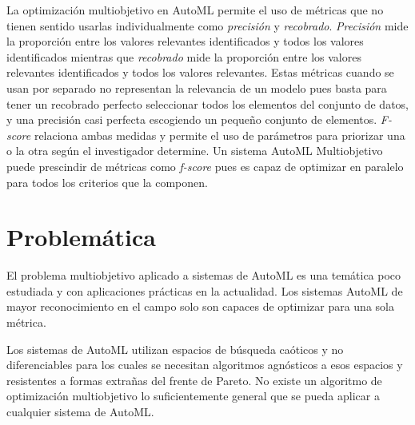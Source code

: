 La optimizaci\'on multiobjetivo en AutoML permite el uso de m\'etricas que no tienen sentido usarlas individualmente como \textit{precisi\'on} y \textit{recobrado}. 
 \textit{Precisi\'on} mide la proporci\'on entre los valores relevantes identificados y todos los valores identificados
 mientras que \textit{recobrado} mide la proporci\'on entre los valores relevantes identificados y todos los valores relevantes.
Estas m\'etricas cuando se usan por separado no representan la relevancia de un modelo pues basta para tener un recobrado perfecto seleccionar todos los elementos del conjunto de datos, y una precisi\'on casi perfecta escogiendo un pequeño conjunto de elementos.
\textit{F-score} relaciona ambas medidas y permite el uso de  par\'ametros para priorizar una o la otra seg\'un el investigador determine. 
Un sistema AutoML Multiobjetivo puede prescindir de m\'etricas como \textit{f-score} pues es capaz de optimizar en paralelo para todos los criterios que la componen.

\section*{Problem\'atica}
El problema multiobjetivo aplicado a sistemas de AutoML es una tem\'atica poco estudiada y con aplicaciones pr\'acticas en la actualidad.
Los sistemas AutoML de mayor reconocimiento en el campo solo son capaces de optimizar para una sola m\'etrica. 

Los sistemas de AutoML utilizan espacios de b\'usqueda ca\'oticos y no diferenciables para los cuales se necesitan algoritmos agn\'osticos a esos espacios y resistentes a formas extra\~nas del frente de Pareto. No existe un algoritmo de optimizaci\'on multiobjetivo lo suficientemente general que se pueda aplicar a cualquier sistema de AutoML.

